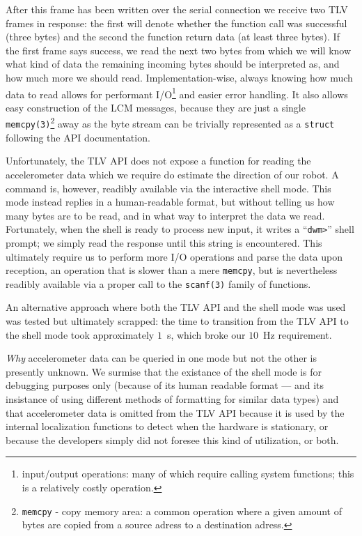 After this frame has been written over the serial connection we receive two TLV frames in response:
the first will denote whether the function call was successful (three bytes) and the second the function return data (at least three bytes).
If the first frame says success, we read the next two bytes from which we will know what kind of data the remaining incoming bytes should be interpreted as,
and how much more we should read.
Implementation-wise, always knowing how much data to read allows for performant I/O\footnote{input/output operations: many of which require calling system functions; this is a relatively costly operation.} and easier error handling.
It also allows easy construction of the LCM messages, because they are just a single \texttt{memcpy(3)}\footnote{\texttt{memcpy} - copy memory area: a common operation where a given amount of bytes are copied from a source adress to a destination adress.} away as the byte stream can be trivially represented as a \texttt{struct} following the API documentation.

Unfortunately, the TLV API does not expose a function for reading the accelerometer data which we require do estimate the direction of our robot.
A command is, however, readibly available via the interactive shell mode.
This mode instead replies in a human-readable format, but without telling us how many bytes are to be read, and in what way to interpret the data we read.
Fortunately, when the shell is ready to process new input, it writes a ``\texttt{dwm>}'' shell prompt;
we simply read the response until this string is encountered.
This ultimately require us to perform more I/O operations and parse the data upon reception, an operation that is slower than a mere \texttt{memcpy},
but is nevertheless readibly available via a proper call to the \texttt{scanf(3)} family of functions.

An alternative approach where both the TLV API and the shell mode was used was tested but ultimately scrapped:
the time to transition from the TLV API to the shell mode took approximately $1$~s, which broke our $10$~Hz requirement.

\textit{Why} accelerometer data can be queried in one mode but not the other is presently unknown.
We surmise that the existance of the shell mode is for debugging purposes only (because of its human readable format --- and its insistance of using different methods of formatting for similar data types) and that accelerometer data is omitted from the TLV API because it is used by the internal localization functions to detect when the hardware is stationary, or because the developers simply did not foresee this kind of utilization, or both.

